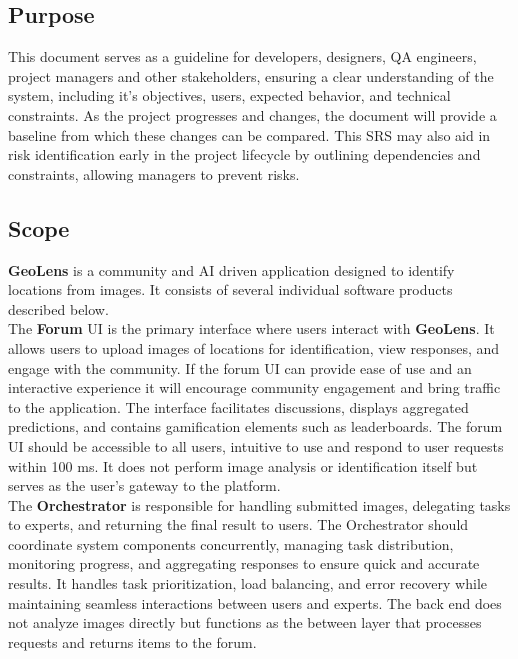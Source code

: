 \documentclass[]{article}
\begin{document}
\subsection{Purpose}
\label{sub:purpose}
This document serves as a guideline for developers, designers, QA engineers, project managers and other stakeholders, ensuring a clear understanding of the system, including it's objectives, users, expected behavior, and technical constraints.
As the project progresses and changes, the document will provide a baseline from which these changes can be compared. This SRS may also aid in risk identification early in the project lifecycle by outlining dependencies and constraints, allowing managers to prevent risks.

\subsection{Scope}
\label{sub:scope}
\textbf{GeoLens} is a community and AI driven application designed to identify locations from images. It consists of several individual software products described below.\\

The \textbf{Forum} UI is the primary interface where users interact with \textbf{GeoLens}. It allows users to upload images of locations for identification, view responses, and
engage with the community. If the forum UI can provide ease of use and an interactive experience it will encourage community engagement and bring traffic to the
application. The interface facilitates discussions, displays aggregated predictions, and contains gamification elements such as leaderboards. The forum UI should be accessible
to all users, intuitive to use and respond to user requests within 100 ms. It does not perform image analysis or identification itself but serves as the user’s gateway to the platform.\\

The \textbf{Orchestrator} is responsible for handling submitted images, delegating tasks to experts,
and returning the final result to users. The Orchestrator should coordinate system components concurrently, managing task distribution, monitoring progress, and aggregating responses to ensure quick and accurate results. It handles task prioritization, load balancing, and error recovery while maintaining seamless interactions between users and experts.
The back end does not analyze images directly but functions as the between layer that processes requests and returns items to the forum.\\
\end{document}
